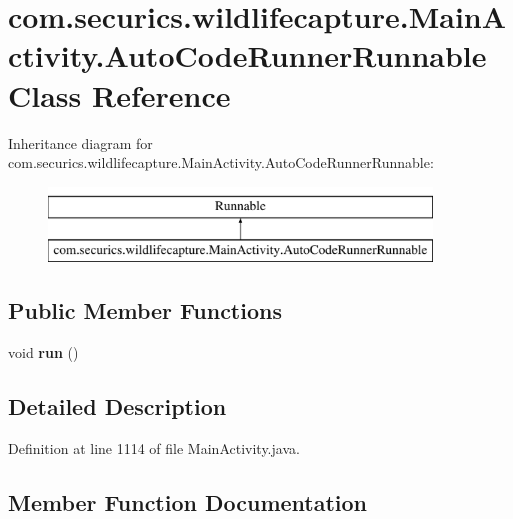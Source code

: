 \section{com.\+securics.\+wildlifecapture.\+Main\+Activity.\+Auto\+Code\+Runner\+Runnable Class Reference}
\label{classcom_1_1securics_1_1wildlifecapture_1_1_main_activity_1_1_auto_code_runner_runnable}
Inheritance diagram for com.\+securics.\+wildlifecapture.\+Main\+Activity.\+Auto\+Code\+Runner\+Runnable\+:\begin{figure}[H]
\begin{center}
\leavevmode
\includegraphics[height=2.000000cm]{classcom_1_1securics_1_1wildlifecapture_1_1_main_activity_1_1_auto_code_runner_runnable}
\end{center}
\end{figure}
\subsection*{Public Member Functions}
\begin{DoxyCompactItemize}
\item 
void {\bf run} ()
\end{DoxyCompactItemize}


\subsection{Detailed Description}


Definition at line 1114 of file Main\+Activity.\+java.



\subsection{Member Function Documentation}
